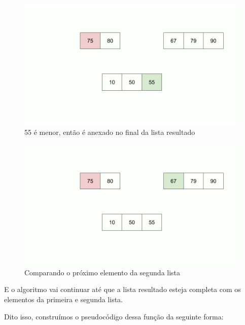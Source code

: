 \begin{figure}[!ht]
	\centering
	\includegraphics[scale=0.3]{figures/merge/merge-function-9.png}
	\caption{55 é menor, então é anexado no final da lista resultado}
\end{figure}
\begin{figure}[!ht]
	\centering
	\includegraphics[scale=0.3]{figures/merge/merge-function-11.png}
	\caption{Comparando o próximo elemento da segunda lista}
\end{figure}

\FloatBarrier

E o algoritmo vai continuar até que a lista resultado esteja completa com os elementos da primeira e segunda lista.

Dito isso, construímos o pseudocódigo dessa função da seguinte forma:

